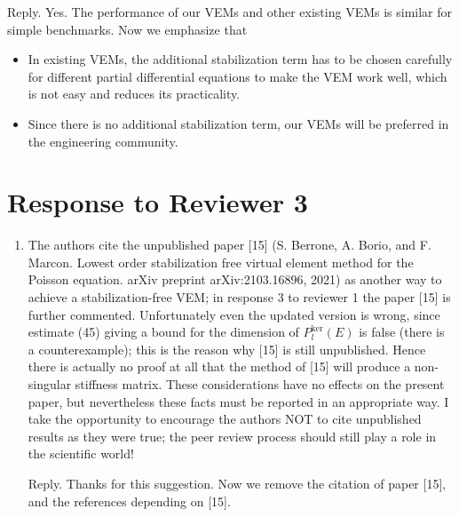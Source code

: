 \documentclass[10pt]{amsart}
\theoremstyle{definition}
\theoremstyle{remark}
\begin{document}
\begin{enumerate}[1.]
\smallskip \noindent \textcolor[rgb]{1.00,0.00,0.00}{Reply.}
Yes. The performance of our VEMs and other existing VEMs is similar for simple benchmarks.
Now we emphasize that
\begin{itemize}
\item
In existing VEMs, the additional stabilization term has to be chosen carefully for different partial differential equations to make the VEM work well, which is not easy and reduces its practicality.
\item 
Since there is no additional stabilization term, our VEMs will be preferred in the engineering community. 
\end{itemize}


\end{enumerate}




\section{Response to Reviewer 3}

\begin{enumerate}[1.]
\item \textsf{The authors cite the unpublished paper [15] (S. Berrone, A. Borio, and F. Marcon. Lowest order stabilization free virtual element method for the Poisson equation. arXiv preprint arXiv:2103.16896, 2021) as another way to achieve a stabilization-free VEM; in response 3 to reviewer 1 the paper [15] is further commented. Unfortunately even the updated version is wrong, since estimate (45) giving a bound for the dimension of $P_l^\text{ker}(E)$ is false (there is a counterexample); this is the reason why [15] is still unpublished. Hence there is actually no proof at all that the method of [15] will produce a non-singular stiffness matrix. These considerations have no effects on the present paper, but nevertheless these facts must be reported in an appropriate way. \vskip0.1cm
\noindent 
I take the opportunity to encourage the authors NOT to cite unpublished results as they were true; the peer review process should still play a role in the scientific world!}

\smallskip \noindent \textcolor[rgb]{1.00,0.00,0.00}{Reply.}
Thanks for this suggestion. Now we remove the citation of paper [15], and the references depending on [15].



\end{enumerate}





\end{document}
